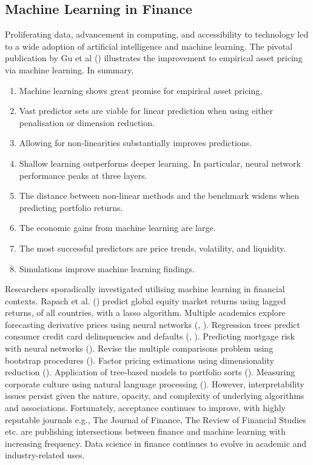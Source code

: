 \documentclass[12pt]{article}
\begin{document}
\subsection{Machine Learning in Finance}
Proliferating data, advancement in computing, and accessibility to technology led to a wide adoption of artificial intelligence and machine learning.
The pivotal publication by Gu et al (\citeyear{eapvml}) illustrates the improvement to empirical asset pricing via machine learning.
In summary,
\singlespacing
\begin{enumerate}
	\item Machine learning shows great promise for empirical asset pricing,
	\item Vast predictor sets are viable for linear prediction when using either penalisation or dimension reduction.
	\item Allowing for non-linearities substantially improves predictions.
	\item Shallow learning outperforms deeper learning. In particular, neural network performance peaks at three layers.
	\item The distance between non-linear methods and the benchmark widens when predicting portfolio returns.
	\item The economic gains from machine learning are large.
	\item The most successful predictors are price trends, volatility, and liquidity.
	\item Simulations improve machine learning findings.
\end{enumerate}
\doublespacing
Researchers sporadically investigated utilising machine learning in financial contexts.
Rapach et al. (\citeyear{rapach2013international}) predict global equity market returns using lagged returns, of all countries, with a lasso algorithm.
Multiple academics explore forecasting derivative prices using neural networks (\cite{fleck1994strain}, \cite{cai2000functional}).
Regression trees predict consumer credit card delinquencies and defaults (\cite{khandani2010consumer}, \cite{butaru2016risk}).
Predicting mortgage risk with neural networks (\cite{sirignano2016deep}).
Revise the multiple comparisons problem using bootstrap procedures (\cite{harvey2016and}).
Factor pricing estimations using dimensionality reduction (\cite{feng2020taming}).
Application of tree-based models to portfolio sorts (\cite{moritz2016tree}).
Measuring corporate culture using natural language processing (\cite{corporate-culture}).
However, interpretability issues persist given the nature, opacity, and complexity of underlying algorithms and associations.
Fortunately, acceptance continues to improve, with highly reputable journals e.g.,
The Journal of Finance, The Review of Financial Studies etc. are publishing intersections between finance and machine learning with increasing frequency.
Data science in finance continues to evolve in academic and industry-related uses.
\end{document}
